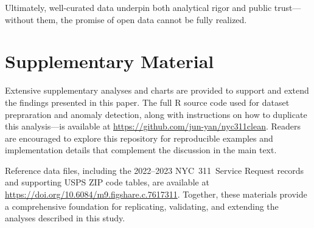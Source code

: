 \documentclass[linenumber]{jdsart}
\begin{document}
Ultimately, well-curated data underpin both analytical rigor and public 
trust—without them, the promise of open data cannot be fully realized.



\section*{Supplementary Material}
Extensive supplementary analyses and charts are provided to support 
and extend the findings presented in this paper.  
The full \textsc{R} source code used for dataset prepraration and anomaly detection, 
along with instructions on how to duplicate this analysis—is available at 
\url{https://github.com/jun-yan/nyc311clean}.  
Readers are encouraged to explore this repository for reproducible examples 
and implementation details that complement the discussion in the main text.  

Reference data files, including the 2022--2023 NYC~311~Service Request 
records and supporting USPS ZIP code tables, are available at 
\url{https://doi.org/10.6084/m9.figshare.c.7617311}.  
Together, these materials provide a comprehensive foundation for replicating, 
validating, and extending the analyses described in this study.



\end{document}
